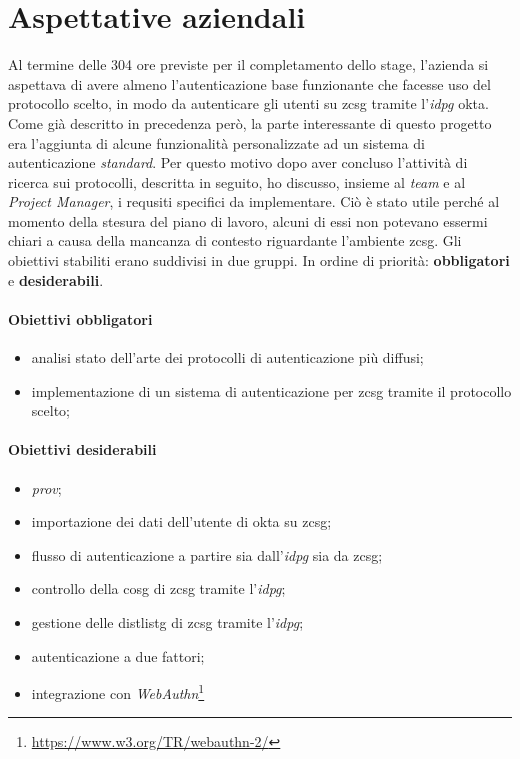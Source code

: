 \section{Aspettative aziendali}\label{sec:aspettative_aziendali}
    Al termine delle 304 ore previste per il completamento dello stage, l'azienda si aspettava di avere almeno l'autenticazione base funzionante che facesse uso del protocollo scelto, in modo da autenticare gli utenti su \gls{zcsg} tramite l'\textit{\gls{idpg}} \gls{okta}. Come già descritto in precedenza però, la parte interessante di questo progetto era l'aggiunta di alcune funzionalità personalizzate ad un sistema di autenticazione \textit{standard}. Per questo motivo dopo aver concluso l'attività di ricerca sui protocolli, descritta in seguito, ho discusso, insieme al \textit{team} e al \textit{Project Manager}, i requsiti specifici da implementare. Ciò è stato utile perché al momento della stesura del piano di lavoro, alcuni di essi non potevano essermi chiari a causa della mancanza di contesto riguardante l'ambiente \gls{zcsg}. Gli obiettivi stabiliti erano suddivisi in due gruppi. In ordine di priorità: \textbf{obbligatori} e \textbf{desiderabili}.
    \paragraph{Obiettivi obbligatori}
    \begin{itemize}
        \item analisi stato dell'arte dei protocolli di autenticazione più diffusi;
        \item implementazione di un sistema di autenticazione per \gls{zcsg} tramite il protocollo scelto;
    \end{itemize}
    \paragraph{Obiettivi desiderabili}
    \begin{itemize}
        \item \textit{\gls{prov}};
        \item importazione dei dati dell'utente di \gls{okta} su \gls{zcsg};
        \item flusso di autenticazione a partire sia dall'\textit{\gls{idpg}} sia da \gls{zcsg};
        \item controllo della \gls{cosg} di \gls{zcsg} tramite l'\textit{\gls{idpg}};
        \item gestione delle \gls{distlistg} di \gls{zcsg} tramite l'\textit{\gls{idpg}};
        \item autenticazione a due fattori;
        \item integrazione con \textit{WebAuthn}\footnote{\url{https://www.w3.org/TR/webauthn-2/}}
    \end{itemize}


